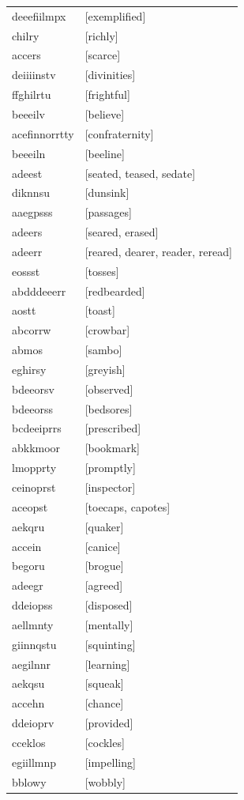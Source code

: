 \documentclass{article}
\begin{document}
\begin{tabular}{ll}
deeefiilmpx & [exemplified] \\
chilry & [richly] \\
accers & [scarce] \\
deiiiinstv & [divinities] \\
ffghilrtu & [frightful] \\
beeeilv & [believe] \\
acefinnorrtty & [confraternity] \\
beeeiln & [beeline] \\
adeest & [seated, teased, sedate] \\
diknnsu & [dunsink] \\
aaegpsss & [passages] \\
adeers & [seared, erased] \\
adeerr & [reared, dearer, reader, reread] \\
eossst & [tosses] \\
abdddeeerr & [redbearded] \\
aostt & [toast] \\
abcorrw & [crowbar] \\
abmos & [sambo] \\
eghirsy & [greyish] \\
bdeeorsv & [observed] \\
bdeeorss & [bedsores] \\
bcdeeiprrs & [prescribed] \\
abkkmoor & [bookmark] \\
lmopprty & [promptly] \\
ceinoprst & [inspector] \\
aceopst & [toecaps, capotes] \\
aekqru & [quaker] \\
accein & [canice] \\
begoru & [brogue] \\
adeegr & [agreed] \\
ddeiopss & [disposed] \\
aellmnty & [mentally] \\
giinnqstu & [squinting] \\
aegilnnr & [learning] \\
aekqsu & [squeak] \\
accehn & [chance] \\
ddeioprv & [provided] \\
cceklos & [cockles] \\
egiillmnp & [impelling] \\
bblowy & [wobbly] \\

\end{tabular}
\end{document}
